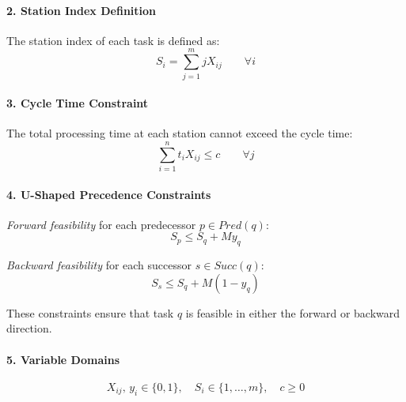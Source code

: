 \documentclass[12pt,a4paper]{article}
\begin{document}
\paragraph{2. Station Index Definition}
The station index of each task is defined as:
\begin{equation}
S_i = \sum_{j=1}^{m} j X_{ij} \qquad \forall i
\end{equation}

\paragraph{3. Cycle Time Constraint}
The total processing time at each station cannot exceed the cycle time:
\begin{equation}
\sum_{i=1}^{n} t_i X_{ij} \le c \qquad \forall j
\end{equation}

\paragraph{4. U-Shaped Precedence Constraints}

\textit{Forward feasibility} for each predecessor $p \in Pred(q)$:
\begin{equation}
S_p \le S_q + M y_q
\tag{4a}
\end{equation}

\textit{Backward feasibility} for each successor $s \in Succ(q)$:
\begin{equation}
S_s \le S_q + M (1 - y_q)
\tag{4b}
\end{equation}

These constraints ensure that task $q$ is feasible in either the forward or backward direction.

\paragraph{5. Variable Domains}

\begin{equation}
X_{ij},\, y_i \in \{0,1\}, 
\quad S_i \in \{1,\ldots,m\},
\quad c \ge 0
\end{equation}




\newpage
\end{document}
